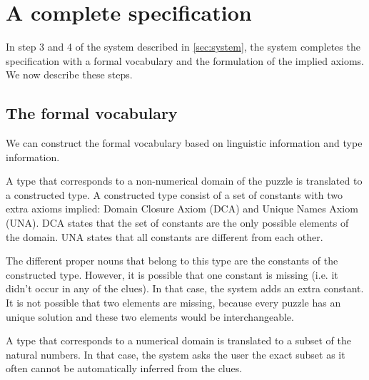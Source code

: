 \section{A complete specification}
In step 3 and 4 of the system described in \ref{sec:system}, the system completes the specification with a formal vocabulary and the formulation of the implied axioms. We now describe these steps.

\subsection{The formal vocabulary}
\label{sec:vocabulary}
We can construct the formal vocabulary based on linguistic information and type information.

A type that corresponds to a non-numerical domain of the puzzle is translated to a constructed type. A constructed type consist of a set of constants with two extra axioms implied: Domain Closure Axiom (DCA) and Unique Names Axiom (UNA). DCA states that the set of constants are the only possible elements of the domain. UNA states that all constants are different from each other.

The different proper nouns that belong to this type are the constants of the constructed type. However, it is possible that one constant is missing (i.e. it didn't occur in any of the clues). In that case, the system adds an extra constant. It is not possible that two elements are missing, because every puzzle has an unique solution and  these two elements would be interchangeable.

A type that corresponds to a numerical domain is translated to a subset of the natural numbers. In that case, the system asks the user the exact subset as it often cannot be automatically inferred from the clues.



